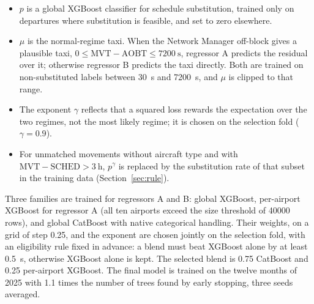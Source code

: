 \documentclass[11pt,a4paper]{article}
\begin{document}
\begin{itemize}
\item \(p\) is a global XGBoost classifier for schedule substitution, trained
only on departures where substitution is feasible, and set to zero elsewhere.
\item \(\mu\) is the normal-regime taxi. When the Network Manager off-block
gives a plausible taxi, \(0 \le \text{MVT} - \text{AOBT} \le
\SI{7200}{\second}\), regressor A predicts the residual over it; otherwise
regressor B predicts the taxi directly. Both are trained on non-substituted
labels between \SI{30}{\second} and \SI{7200}{\second}, and \(\mu\) is clipped
to that range.
\item The exponent \(\gamma\) reflects that a squared loss rewards the
expectation over the two regimes, not the most likely regime; it is chosen on
the selection fold (\(\gamma = 0.9\)).
\item For unmatched movements without aircraft type and with
\(\text{MVT} - \text{SCHED} > \SI{3}{\hour}\), \(p^{\gamma}\) is replaced by
the substitution rate of that subset in the training data
(Section~\ref{sec:rule}).
\end{itemize}

Three families are trained for regressors A and B: global XGBoost,
per-airport XGBoost for regressor A (all ten airports exceed the size
threshold of \num{40000} rows), and global CatBoost with native categorical
handling. Their weights, on a grid of step \num{0.25}, and the exponent are
chosen jointly on the selection fold, with an eligibility rule fixed in
advance: a blend must beat XGBoost alone by at least \SI{0.5}{\second},
otherwise XGBoost alone is kept. The selected blend is \num{0.75} CatBoost and
\num{0.25} per-airport XGBoost. The final model is trained on the twelve
months of 2025 with \num{1.1} times the number of trees found by early
stopping, three seeds averaged.
\end{document}
